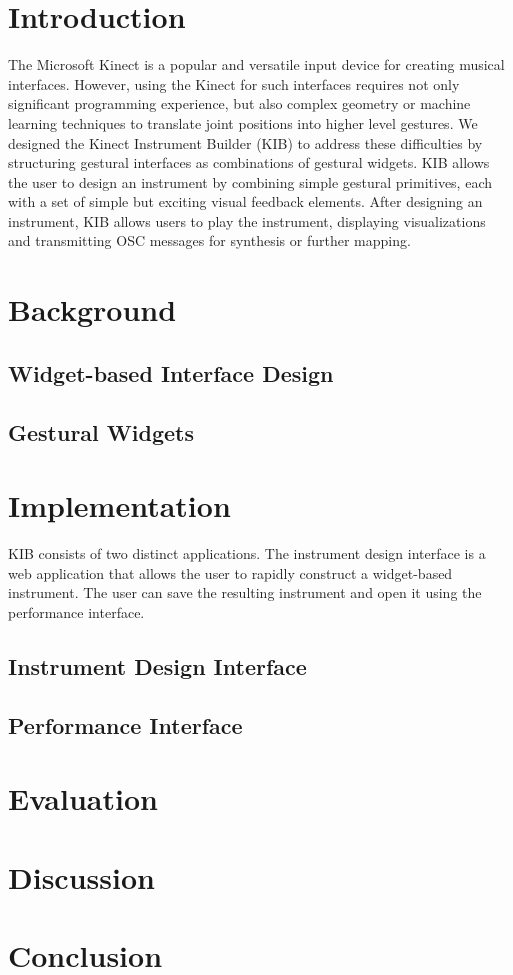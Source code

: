 \documentclass{nime-alternate}
\begin{document}

\section{Introduction}
The Microsoft Kinect is a popular and versatile input device for creating musical interfaces.
However, using the Kinect for such interfaces requires not only significant programming
experience, but also complex geometry or machine learning techniques to translate joint
positions into higher level gestures. We designed the Kinect Instrument Builder (KIB) to
address these difficulties by structuring gestural interfaces as combinations of gestural
widgets. KIB allows the user to design an instrument by combining simple gestural primitives,
each with a set of simple but exciting visual feedback elements. After designing an instrument,
KIB allows users to play the instrument, displaying visualizations and transmitting OSC 
messages for synthesis or further mapping.
\section{Background}
\subsection{Widget-based Interface Design}
\subsection{Gestural Widgets}
\section{Implementation}
KIB consists of two distinct applications. The instrument design interface is a web
application that allows the user to rapidly construct a widget-based instrument. The user
can save the resulting instrument and open it using the performance interface.
\subsection{Instrument Design Interface}
\subsection{Performance Interface}
\section{Evaluation}
\section{Discussion}
\section{Conclusion}
\end{document}
